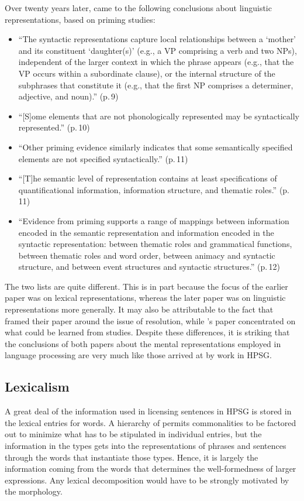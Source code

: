 \documentclass[output=paper
	        ,collection
	        ,collectionchapter
 	        ,biblatex
                ,babelshorthands
                ,newtxmath
                ,draftmode
                ,colorlinks, citecolor=brown
]{langscibook}
\begin{document}
Over twenty years later, \citet{BraniganPickering2017} came to the following conclusions about linguistic representations, based on priming studies:
\begin{itemize}
\item ``The syntactic representations capture local relationships
between a `moth\-er' and its constituent `daughter(s)' (e.g.,
a VP comprising a verb and two NPs), independent of the
larger context in which the phrase appears (e.g., that the VP
occurs within a subordinate clause), or the internal structure
of the subphrases that constitute it (e.g., that the
first NP comprises a determiner, adjective, and noun).'' (p.\,9)
\item ``[S]ome elements that are not phonologically represented may
be syntactically represented.'' (p.\,10)
\item ``Other priming evidence similarly indicates that some
semantically specified elements are not specified syntactically.'' (p.\,11)
\item ``[T]he semantic level of representation
contains at least specifications of quantificational information,
information structure, and thematic roles.'' (p.\,11)
\item ``Evidence
from priming supports a range of mappings between information encoded in the semantic representation and information encoded in the syntactic representation: between
thematic roles and grammatical functions, between thematic roles and word order, between animacy and syntactic
structure, and between event structures and syntactic
structures.'' (p.\,12)
\end{itemize}
The two lists are quite different.  This is in part because the focus of the earlier paper was on lexical representations, whereas the later paper was on linguistic representations more generally.  It may also be attributable to the fact that \citeauthor{MPS94a-u} framed their paper around the issue of  resolution, while \citeauthor{BraniganPickering2017}'s paper concentrated on what could be learned from  studies.  Despite these differences, it is striking that the conclusions of both papers about the mental representations employed in language processing are very much like those arrived at by work in HPSG.

\subsection{Lexicalism}

A great deal of the information used in licensing sentences in HPSG is stored in the lexical entries for words.  A hierarchy of  permits commonalities to be factored out to minimize what has to be stipulated in individual entries, but the information in the types gets into the representations of phrases and sentences through the words that instantiate those types. Hence, it is largely the information coming from the words that determines the well-formedness of larger expressions.  Any lexical decomposition would have to be strongly motivated by the morphology.
\end{document}
